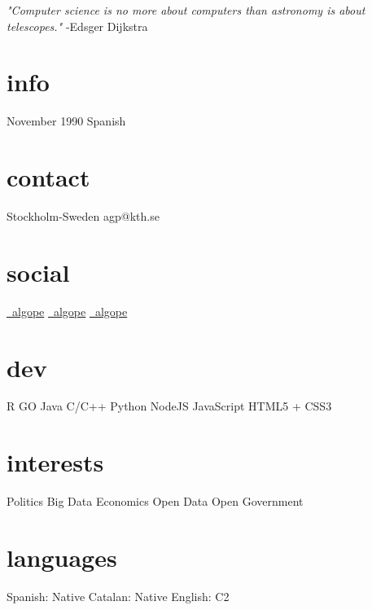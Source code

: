\documentclass[]{cv}
\begin{document}
       {\emph{"Computer science is no more about computers than astronomy is about telescopes."} -Edsger Dijkstra}


\begin{aside}
	\section{info}
	November 1990
	Spanish
	~~~
    \section{contact}
        Stockholm-Sweden
        agp@kth.se
        ~~~
    \section{social}
        \href{https://www.linkedin.com/in/algope}{\faLinkedin\ algope} 
        \href{http://github.com/algope}{\faGithub\ algope}
        \href{http://twitter.com/algope_}{\faTwitter\ algope}
        ~~~
    \section{dev}
        R
        GO
        Java
        C/C++
        Python
        NodeJS
        JavaScript
        HTML5 + CSS3
        ~~~
    \section{interests}
        Politics
        Big Data
        Economics
        Open Data
        Open Government
        ~~~
     \section{languages}
     	Spanish: Native
     	Catalan: Native
     	English: C2
      	~~~
\end{aside}
\end{document}
